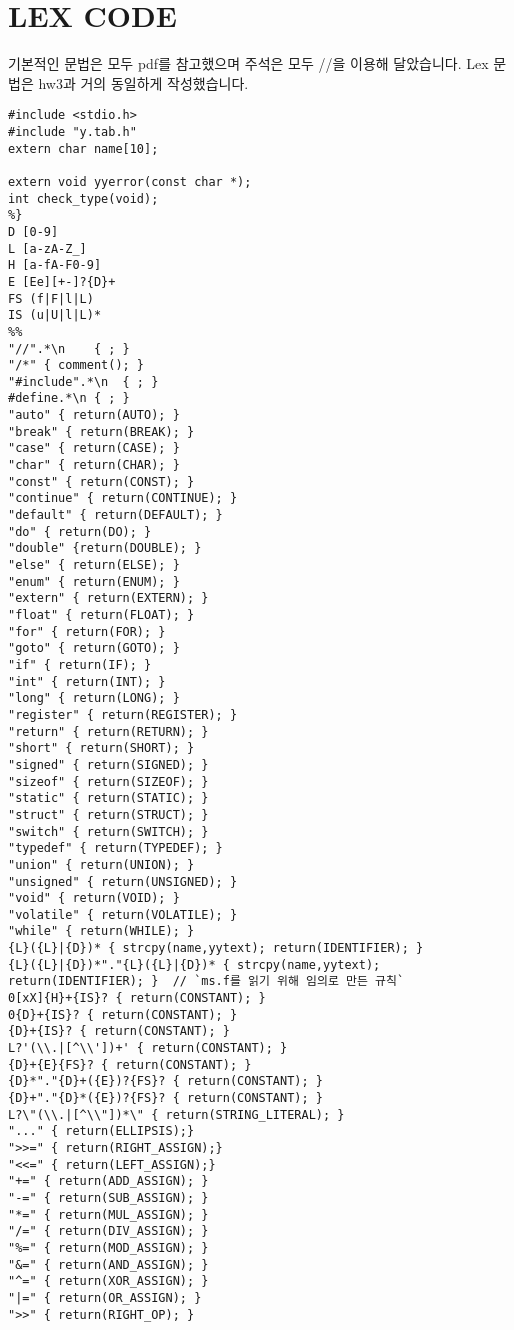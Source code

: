 \documentclass{article}
\begin{document}
\section{LEX CODE}
 기본적인 문법은 모두 pdf를 참고했으며 주석은 모두 //을 이용해 달았습니다.\newline
 Lex 문법은 hw3과 거의 동일하게 작성했습니다.
\begin{lstlisting}[escapeinside=``]
%{
#include <stdio.h>
#include "y.tab.h"
extern char name[10];

extern void yyerror(const char *);
int check_type(void);
%}
D [0-9]
L [a-zA-Z_]
H [a-fA-F0-9]
E [Ee][+-]?{D}+
FS (f|F|l|L)
IS (u|U|l|L)*
%%
"//".*\n	{ ; }
"/*" { comment(); }
"#include".*\n	{ ; }
#define.*\n	{ ; }
"auto" { return(AUTO); }
"break" { return(BREAK); }
"case" { return(CASE); }
"char" { return(CHAR); }
"const" { return(CONST); }
"continue" { return(CONTINUE); }
"default" { return(DEFAULT); }
"do" { return(DO); }
"double" {return(DOUBLE); }
"else" { return(ELSE); }
"enum" { return(ENUM); }
"extern" { return(EXTERN); }
"float" { return(FLOAT); }
"for" { return(FOR); }
"goto" { return(GOTO); }
"if" { return(IF); }
"int" { return(INT); }
"long" { return(LONG); }
"register" { return(REGISTER); }
"return" { return(RETURN); }
"short" { return(SHORT); }
"signed" { return(SIGNED); }
"sizeof" { return(SIZEOF); }
"static" { return(STATIC); }
"struct" { return(STRUCT); }
"switch" { return(SWITCH); }
"typedef" { return(TYPEDEF); }
"union" { return(UNION); }
"unsigned" { return(UNSIGNED); }
"void" { return(VOID); }
"volatile" { return(VOLATILE); }
"while" { return(WHILE); }
{L}({L}|{D})* { strcpy(name,yytext); return(IDENTIFIER); }
{L}({L}|{D})*"."{L}({L}|{D})* { strcpy(name,yytext); return(IDENTIFIER); }  // `ms.f를 읽기 위해 임의로 만든 규칙`
0[xX]{H}+{IS}? { return(CONSTANT); }
0{D}+{IS}? { return(CONSTANT); }
{D}+{IS}? { return(CONSTANT); }
L?'(\\.|[^\\'])+' { return(CONSTANT); }
{D}+{E}{FS}? { return(CONSTANT); }
{D}*"."{D}+({E})?{FS}? { return(CONSTANT); }
{D}+"."{D}*({E})?{FS}? { return(CONSTANT); }
L?\"(\\.|[^\\"])*\" { return(STRING_LITERAL); }
"..." { return(ELLIPSIS);}
">>=" { return(RIGHT_ASSIGN);}
"<<=" { return(LEFT_ASSIGN);}
"+=" { return(ADD_ASSIGN); }
"-=" { return(SUB_ASSIGN); }
"*=" { return(MUL_ASSIGN); }
"/=" { return(DIV_ASSIGN); }
"%=" { return(MOD_ASSIGN); }
"&=" { return(AND_ASSIGN); }
"^=" { return(XOR_ASSIGN); }
"|=" { return(OR_ASSIGN); }
">>" { return(RIGHT_OP); }

\end{lstlisting}
\end{document}
